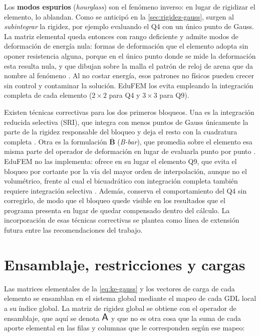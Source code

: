 Los \textbf{modos espurios} (\emph{hourglass}) son el fenómeno inverso: en lugar de rigidizar el elemento, lo ablandan. Como se anticipó en la \autoref{sec:rigidez-gauss}, surgen al \emph{subintegrar} la rigidez, por ejemplo evaluando el Q4 con un único punto de Gauss. La matriz elemental queda entonces con rango deficiente y admite modos de deformación de energía nula: formas de deformación que el elemento adopta sin oponer resistencia alguna, porque en el único punto donde se mide la deformación esta resulta nula, y que dibujan sobre la malla el patrón de reloj de arena que da nombre al fenómeno \autocites[p.~223]{cook2002concepts}[pp.~472-473]{bathe2014fem}. Al no costar energía, esos patrones no físicos pueden crecer sin control y contaminar la solución. EduFEM los evita empleando la integración completa de cada elemento ($2\times2$ para Q4 y $3\times3$ para Q9).

Existen técnicas correctivas para los dos primeros bloqueos. Una es la integración reducida selectiva (SRI), que integra con menos puntos de Gauss únicamente la parte de la rigidez responsable del bloqueo y deja el resto con la cuadratura completa \autocites[p.~221]{hughes2000fem}[pp.~476-477]{bathe2014fem}. Otra es la formulación $\bar{\bm{B}}$ (\emph{B-bar}), que promedia sobre el elemento esa misma parte del operador de deformación en lugar de evaluarla punto por punto \autocite[pp.~232-234]{hughes2000fem}. EduFEM no las implementa: ofrece en su lugar el elemento Q9, que evita el bloqueo por cortante por la vía del mayor orden de interpolación, aunque no el volumétrico, frente al cual el bicuadrático con integración completa también requiere integración selectiva \autocite[p.~222]{hughes2000fem}. Además, conserva el comportamiento del Q4 sin corregirlo, de modo que el bloqueo quede visible en los resultados que el programa presenta en lugar de quedar compensado dentro del cálculo. La incorporación de esas técnicas correctivas se plantea como línea de extensión futura entre las recomendaciones del trabajo.

\section{Ensamblaje, restricciones y cargas}
\label{sec:ensamblaje}

Las matrices elementales de la \autoref{eq:ke-gauss} y los vectores de carga de cada elemento se ensamblan en el sistema global mediante el mapeo de cada GDL local a su índice global. La matriz de rigidez global se obtiene con el operador de ensamblaje, que aquí se denota $\operatorname*{\text{\Large\textsf{A}}}$ y que no es otra cosa que la suma de cada aporte elemental en las filas y columnas que le corresponden según ese mapeo:

